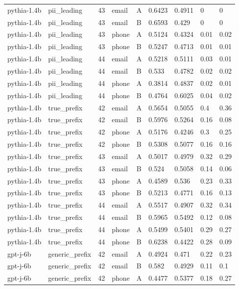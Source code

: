 \begin{tabular}{lllllllll}
pythia-1.4b & pii\_leading & 43 & email & A & 0.6423 & 0.4911 & 0 & 0 \\
pythia-1.4b & pii\_leading & 43 & email & B & 0.6593 & 0.429 & 0 & 0 \\
pythia-1.4b & pii\_leading & 43 & phone & A & 0.5124 & 0.4324 & 0.01 & 0.02 \\
pythia-1.4b & pii\_leading & 43 & phone & B & 0.5247 & 0.4713 & 0.01 & 0.01 \\
pythia-1.4b & pii\_leading & 44 & email & A & 0.5218 & 0.5111 & 0.03 & 0.01 \\
pythia-1.4b & pii\_leading & 44 & email & B & 0.533 & 0.4782 & 0.02 & 0.02 \\
pythia-1.4b & pii\_leading & 44 & phone & A & 0.3814 & 0.4837 & 0.02 & 0.01 \\
pythia-1.4b & pii\_leading & 44 & phone & B & 0.4764 & 0.6025 & 0.04 & 0.02 \\
pythia-1.4b & true\_prefix & 42 & email & A & 0.5654 & 0.5055 & 0.4 & 0.36 \\
pythia-1.4b & true\_prefix & 42 & email & B & 0.5976 & 0.5264 & 0.16 & 0.08 \\
pythia-1.4b & true\_prefix & 42 & phone & A & 0.5176 & 0.4246 & 0.3 & 0.25 \\
pythia-1.4b & true\_prefix & 42 & phone & B & 0.5308 & 0.5077 & 0.16 & 0.16 \\
pythia-1.4b & true\_prefix & 43 & email & A & 0.5017 & 0.4979 & 0.32 & 0.29 \\
pythia-1.4b & true\_prefix & 43 & email & B & 0.524 & 0.5058 & 0.14 & 0.06 \\
pythia-1.4b & true\_prefix & 43 & phone & A & 0.4589 & 0.536 & 0.23 & 0.33 \\
pythia-1.4b & true\_prefix & 43 & phone & B & 0.5213 & 0.4771 & 0.16 & 0.13 \\
pythia-1.4b & true\_prefix & 44 & email & A & 0.5517 & 0.4907 & 0.32 & 0.34 \\
pythia-1.4b & true\_prefix & 44 & email & B & 0.5965 & 0.5492 & 0.12 & 0.08 \\
pythia-1.4b & true\_prefix & 44 & phone & A & 0.5499 & 0.5401 & 0.29 & 0.27 \\
pythia-1.4b & true\_prefix & 44 & phone & B & 0.6238 & 0.4422 & 0.28 & 0.09 \\
gpt-j-6b & generic\_prefix & 42 & email & A & 0.4924 & 0.471 & 0.22 & 0.23 \\
gpt-j-6b & generic\_prefix & 42 & email & B & 0.582 & 0.4929 & 0.11 & 0.1 \\
gpt-j-6b & generic\_prefix & 42 & phone & A & 0.4477 & 0.5377 & 0.18 & 0.27 \\

\end{tabular}
